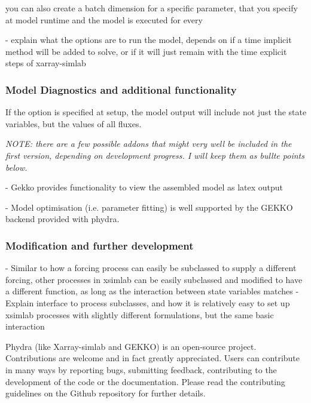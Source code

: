 \documentclass[template.tex]{subfiles}
\begin{document}
you can also create a batch dimension for a specific parameter, that you specify at model runtime and the model is executed for every 

- explain what the options are to run the model, depends on if a time implicit method will be added to solve, or if it will just remain with the time explicit steps of xarray-simlab



\subsubsection{Model Diagnostics and additional functionality}

If the option is specified at setup, the model output will include not just the state variables, but the values of all fluxes.

\textit{NOTE: there are a few possible addons that might very well be included in the first version, depending on development progress. I will keep them as bullte points below.}

- Gekko provides functionality to view the assembled model as latex output

- Model optimisation (i.e. parameter fitting) is well supported by the GEKKO backend provided with phydra. 


\subsubsection{Modification and further development}

- Similar to how a forcing process can easily be subclassed to supply a different forcing, other processes in xsimlab can be easily subclassed and modified to have a different function, as long as the interaction between state variables matches
- Explain interface to process subclasses, and how it is relatively easy to set up xsimlab processes with slightly different  formulations, but the same basic interaction


Phydra (like Xarray-simlab and GEKKO) is an open-source project. Contributions are welcome and in fact greatly appreciated. Users can contribute in many ways by reporting bugs, submitting feedback, contributing to the development of the code or the documentation. Please read the contributing guidelines on the Github repository for further details.
\end{document}
